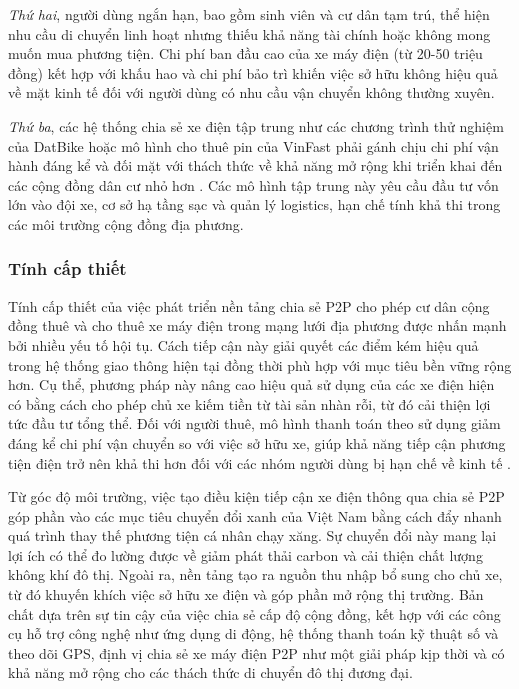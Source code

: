 \textit{Thứ hai}, người dùng ngắn hạn, bao gồm sinh viên và cư dân tạm trú, thể hiện nhu cầu di chuyển linh hoạt nhưng thiếu khả năng tài chính hoặc không mong muốn mua phương tiện. Chi phí ban đầu cao của xe máy điện (từ 20-50 triệu đồng) kết hợp với khấu hao và chi phí bảo trì khiến việc sở hữu không hiệu quả về mặt kinh tế đối với người dùng có nhu cầu vận chuyển không thường xuyên. 

\textit{Thứ ba}, các hệ thống chia sẻ xe điện tập trung như các chương trình thử nghiệm của DatBike hoặc mô hình cho thuê pin của VinFast phải gánh chịu chi phí vận hành đáng kể và đối mặt với thách thức về khả năng mở rộng khi triển khai đến các cộng đồng dân cư nhỏ hơn \cite{vnbusiness2023}. Các mô hình tập trung này yêu cầu đầu tư vốn lớn vào đội xe, cơ sở hạ tầng sạc và quản lý logistics, hạn chế tính khả thi trong các môi trường cộng đồng địa phương.

\subsubsection*{Tính cấp thiết}

Tính cấp thiết của việc phát triển nền tảng chia sẻ P2P cho phép cư dân cộng đồng thuê và cho thuê xe máy điện trong mạng lưới địa phương được nhấn mạnh bởi nhiều yếu tố hội tụ. Cách tiếp cận này giải quyết các điểm kém hiệu quả trong hệ thống giao thông hiện tại đồng thời phù hợp với mục tiêu bền vững rộng hơn. Cụ thể, phương pháp này nâng cao hiệu quả sử dụng của các xe điện hiện có bằng cách cho phép chủ xe kiếm tiền từ tài sản nhàn rỗi, từ đó cải thiện lợi tức đầu tư tổng thể. Đối với người thuê, mô hình thanh toán theo sử dụng giảm đáng kể chi phí vận chuyển so với việc sở hữu xe, giúp khả năng tiếp cận phương tiện điện trở nên khả thi hơn đối với các nhóm người dùng bị hạn chế về kinh tế \cite{ert2016}.

Từ góc độ môi trường, việc tạo điều kiện tiếp cận xe điện thông qua chia sẻ P2P góp phần vào các mục tiêu chuyển đổi xanh của Việt Nam bằng cách đẩy nhanh quá trình thay thế phương tiện cá nhân chạy xăng. Sự chuyển đổi này mang lại lợi ích có thể đo lường được về giảm phát thải carbon và cải thiện chất lượng không khí đô thị. Ngoài ra, nền tảng tạo ra nguồn thu nhập bổ sung cho chủ xe, từ đó khuyến khích việc sở hữu xe điện và góp phần mở rộng thị trường. Bản chất dựa trên sự tin cậy của việc chia sẻ cấp độ cộng đồng, kết hợp với các công cụ hỗ trợ công nghệ như ứng dụng di động, hệ thống thanh toán kỹ thuật số và theo dõi GPS, định vị chia sẻ xe máy điện P2P như một giải pháp kịp thời và có khả năng mở rộng cho các thách thức di chuyển đô thị đương đại.